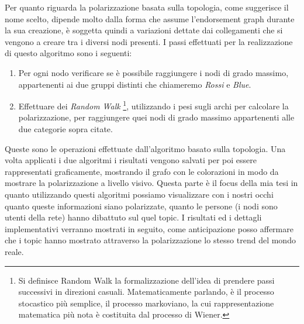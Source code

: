 Per quanto riguarda la polarizzazione basata sulla topologia, come suggerisce il nome scelto, dipende molto dalla forma che assume l'endorsement graph durante la sua creazione, è soggetta quindi a variazioni dettate dai collegamenti che si vengono a creare tra i diversi nodi presenti. I passi effettuati per la realizzazione di questo algoritmo sono i seguenti:
\begin{enumerate}
\item Per ogni nodo verificare se è possibile raggiungere i nodi di grado massimo, appartenenti ai due gruppi distinti che chiameremo \textit{Rossi} e \textit{Blue}.
\item Effettuare dei \textit{Random Walk} \footnote{Si definisce Random Walk la formalizzazione dell'idea di prendere passi successivi in direzioni casuali. Matematicamente parlando, è il processo stocastico più semplice, il processo markoviano, la cui rappresentazione matematica più nota è costituita dal processo di Wiener.}, utilizzando i pesi sugli archi per calcolare la polarizzazione, per raggiungere quei nodi di grado massimo appartenenti alle due categorie sopra citate.
\end{enumerate}
Queste sono le operazioni effettuate dall'algoritmo basato sulla topologia.
Una volta applicati i due algoritmi i risultati vengono salvati per poi essere rappresentati graficamente, mostrando il grafo con le colorazioni in modo da mostrare la polarizzazione a livello visivo.
Questa parte è il focus della mia tesi in quanto utilizzando questi algoritmi possiamo visualizzare con i nostri occhi quanto queste informazioni siano polarizzate, quanto le persone (i nodi sono utenti della rete) hanno dibattuto sul quel topic. I risultati ed i dettagli implementativi verranno mostrati in seguito, come anticipazione posso affermare che i topic hanno mostrato attraverso la polarizzazione lo stesso trend del mondo reale.
